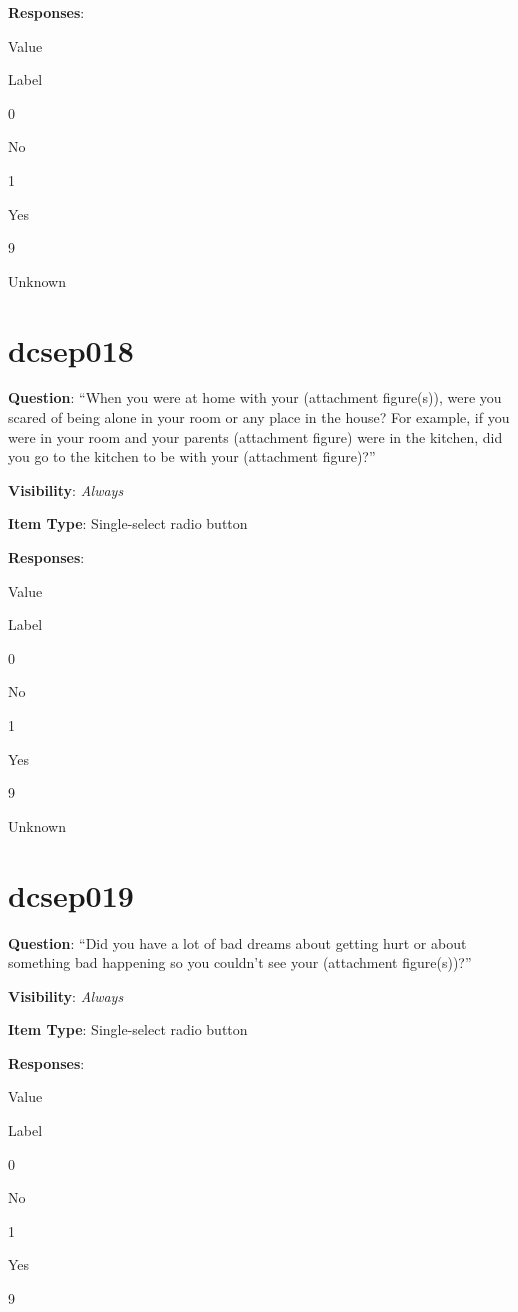 \documentclass[]{book}
\begin{document}
\textbf{Responses}:

Value

Label

0

No

1

Yes

9

Unknown

\hypertarget{dcsep018}{%
\section{dcsep018}\label{dcsep018}}

\textbf{Question}: ``When you were at home with your (attachment figure(s)), were you scared of being alone in your room or any place in the house? For example, if you were in your room and your parents (attachment figure) were in the kitchen, did you go to the kitchen to be with your (attachment figure)?''

\textbf{Visibility}: \emph{Always}

\textbf{Item Type}: Single-select radio button

\textbf{Responses}:

Value

Label

0

No

1

Yes

9

Unknown

\hypertarget{dcsep019}{%
\section{dcsep019}\label{dcsep019}}

\textbf{Question}: ``Did you have a lot of bad dreams about getting hurt or about something bad happening so you couldn't see your (attachment figure(s))?''

\textbf{Visibility}: \emph{Always}

\textbf{Item Type}: Single-select radio button

\textbf{Responses}:

Value

Label

0

No

1

Yes

9
\end{document}
